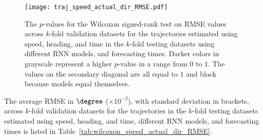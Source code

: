 \begin{figure}[!ht]
	\centering
	\texttt{[image: traj\_speed\_actual\_dir\_RMSE.pdf]}
	\caption{The $p$-values for the Wilcoxon signed-rank test on RMSE values across $k$-fold validation datasets for the trajectories estimated using speed, heading, and time in the $k$-fold testing datasets using different RNN models, and forecasting times. Darker colors in grayscale represent a higher $p$-value in a range from $0$ to $1$. The values on the secondary diagonal are all equal to $1$ and black because models equal themselves.}
	\label{fig:traj_speed_actual_dir_RMSE}
\end{figure}

The average RMSE in $\degree$ ($\times 10^{-2}$), with standard deviation in brackets, across $k$-fold validation datasets for the trajectories in the $k$-fold testing datasets estimated using speed, heading, and time, different RNN models, and forecasting times is listed in Table~\ref{tab:wilcoxon_speed_actual_dir_RMSE}.

\begin{table}[!ht]
	\centering
	\caption{The average RMSE in $\degree$ ($\times 10^{-2}$), with standard deviation in brackets, across $k$-fold validation datasets for the trajectories in the $k$-fold testing datasets estimated using speed, heading, and time, different RNN models, and forecasting times.}
	\label{tab:wilcoxon_speed_actual_dir_RMSE}
\end{table}

